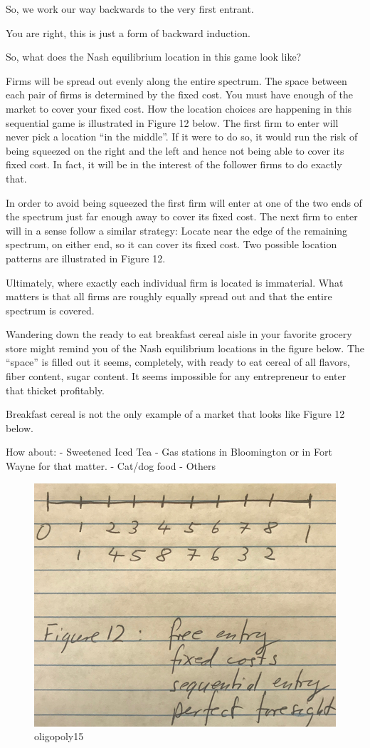 \documentclass[
]{book}
\begin{document}
So, we work our way backwards to the very first entrant.

You are right, this is just a form of backward induction.

So, what does the Nash equilibrium location in this game look like?

Firms will be spread out evenly along the entire spectrum. The space between each pair of firms is determined by the fixed cost. You must have enough of the market to cover your fixed cost. How the location choices are happening in this sequential game is illustrated in Figure 12 below. The first firm to enter will never pick a location ``in the middle''. If it were to do so, it would run the risk of being squeezed on the right and the left and hence not being able to cover its fixed cost. In fact, it will be in the interest of the follower firms to do exactly that.

In order to avoid being squeezed the first firm will enter at one of the two ends of the spectrum just far enough away to cover its fixed cost. The next firm to enter will in a sense follow a similar strategy: Locate near the edge of the remaining spectrum, on either end, so it can cover its fixed cost. Two possible location patterns are illustrated in Figure 12.

Ultimately, where exactly each individual firm is located is immaterial. What matters is that all firms are roughly equally spread out and that the entire spectrum is covered.

Wandering down the ready to eat breakfast cereal aisle in your favorite grocery store might remind you of the Nash equilibrium locations in the figure below. The ``space'' is filled out it seems, completely, with ready to eat cereal of all flavors, fiber content, sugar content. It seems impossible for any entrepreneur to enter that thicket profitably.

Breakfast cereal is not the only example of a market that looks like Figure 12 below.

How about:
- Sweetened Iced Tea
- Gas stations in Bloomington or in Fort Wayne for that matter.
- Cat/dog food
- Others

\begin{figure}

{\centering \includegraphics[width=0.5\linewidth]{img/oligopoly/fig15} 

}

\caption{oligopoly15}\label{fig:oligopoly15}
\end{figure}
\end{document}
